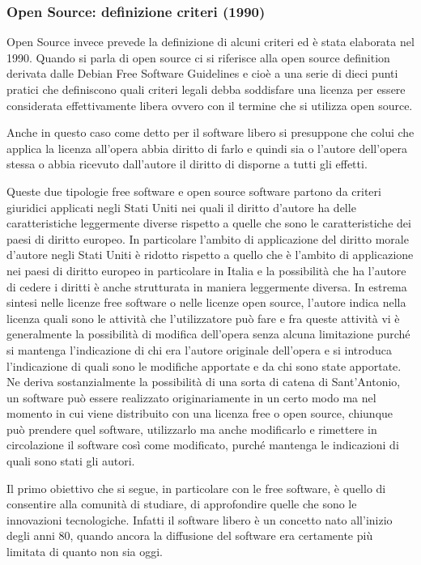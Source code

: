 \subsubsection{Open Source: definizione criteri (1990)}
Open Source invece prevede la definizione di alcuni criteri ed è stata elaborata nel 1990. Quando si parla di open source ci si riferisce alla open source definition derivata dalle Debian Free Software Guidelines e cioè a una serie di dieci punti pratici che definiscono quali criteri legali debba soddisfare una licenza per essere considerata effettivamente libera ovvero con il termine che si utilizza open source. 

Anche in questo caso come detto per il software libero si presuppone che colui che applica la licenza all'opera abbia diritto di farlo e quindi sia o l'autore dell'opera stessa o abbia ricevuto dall'autore il diritto di disporne a tutti gli effetti. 

Queste due tipologie free software e open source software partono da criteri giuridici applicati negli Stati Uniti nei quali il diritto d'autore ha delle caratteristiche leggermente diverse rispetto a quelle che sono le caratteristiche dei paesi di diritto europeo. In particolare l'ambito di applicazione del diritto morale d'autore negli Stati Uniti è ridotto rispetto a quello che è l'ambito di applicazione nei paesi di diritto europeo in particolare in Italia e la possibilità che ha l'autore di cedere i diritti è anche strutturata in maniera leggermente diversa. 
In estrema sintesi nelle licenze free software o nelle licenze open source, l'autore indica nella licenza quali sono le attività che l'utilizzatore può fare e fra queste attività vi è generalmente la possibilità di modifica dell'opera senza alcuna limitazione purché  si mantenga l'indicazione di chi era l'autore originale dell'opera e si introduca l'indicazione di quali sono le modifiche apportate e da chi sono state apportate. 
Ne deriva sostanzialmente la possibilità di una sorta di catena di Sant'Antonio, un software può essere realizzato originariamente in un certo modo ma nel momento in cui viene distribuito con una licenza free o open source, chiunque può prendere quel software, utilizzarlo ma anche modificarlo e rimettere in circolazione il software così come modificato, purché mantenga le indicazioni di quali sono stati gli autori. 

Il primo obiettivo che si segue, in particolare con le free software, è quello di consentire alla comunità di studiare, di approfondire quelle che sono le innovazioni tecnologiche. Infatti il software libero è un concetto nato all'inizio degli anni 80, quando ancora la diffusione del software era certamente più limitata di quanto non sia oggi. 


